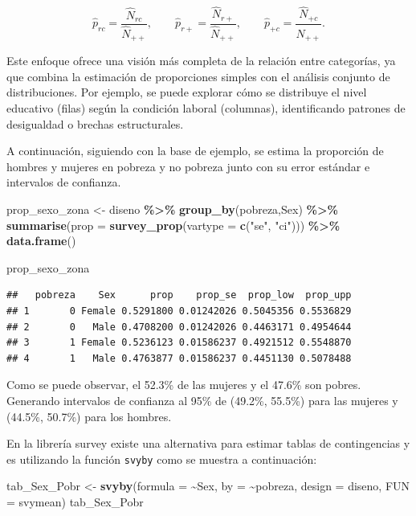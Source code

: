 \documentclass[
  spanish,
  12pt,
]{book}
\newenvironment{Shaded}{\begin{snugshade}}{\end{snugshade}}
\newcommand{\AttributeTok}[1]{\textcolor[rgb]{0.13,0.29,0.53}{#1}}
\newcommand{\FunctionTok}[1]{\textcolor[rgb]{0.13,0.29,0.53}{\textbf{#1}}}
\newcommand{\NormalTok}[1]{#1}
\newcommand{\OtherTok}[1]{\textcolor[rgb]{0.56,0.35,0.01}{#1}}
\newcommand{\SpecialCharTok}[1]{\textcolor[rgb]{0.81,0.36,0.00}{\textbf{#1}}}
\newcommand{\StringTok}[1]{\textcolor[rgb]{0.31,0.60,0.02}{#1}}
\begin{document}
\[
\hat{p}_{rc} = \frac{\hat{N}_{rc}}{\hat{N}_{++}}, \qquad 
\hat{p}_{r+} = \frac{\hat{N}_{r+}}{\hat{N}_{++}}, \qquad 
\hat{p}_{+c} = \frac{\hat{N}_{+c}}{\hat{N}_{++}}.
\]

Este enfoque ofrece una visión más completa de la relación entre categorías, ya que combina la estimación de proporciones simples con el análisis conjunto de distribuciones. Por ejemplo, se puede explorar cómo se distribuye el nivel educativo (filas) según la condición laboral (columnas), identificando patrones de desigualdad o brechas estructurales.

A continuación, siguiendo con la base de ejemplo, se estima la proporción de hombres y mujeres en pobreza y no pobreza junto con su error estándar e intervalos de confianza.

\begin{Shaded}
\begin{Highlighting}[]
\NormalTok{prop\_sexo\_zona }\OtherTok{\textless{}{-}}\NormalTok{ diseno }\SpecialCharTok{\%\textgreater{}\%} 
                  \FunctionTok{group\_by}\NormalTok{(pobreza,Sex) }\SpecialCharTok{\%\textgreater{}\%}
                  \FunctionTok{summarise}\NormalTok{(}\AttributeTok{prop =} \FunctionTok{survey\_prop}\NormalTok{(}\AttributeTok{vartype =} \FunctionTok{c}\NormalTok{(}\StringTok{"se"}\NormalTok{, }\StringTok{"ci"}\NormalTok{))) }\SpecialCharTok{\%\textgreater{}\%} 
                  \FunctionTok{data.frame}\NormalTok{()}

\NormalTok{prop\_sexo\_zona}
\end{Highlighting}
\end{Shaded}

\begin{verbatim}
##   pobreza    Sex      prop    prop_se  prop_low  prop_upp
## 1       0 Female 0.5291800 0.01242026 0.5045356 0.5536829
## 2       0   Male 0.4708200 0.01242026 0.4463171 0.4954644
## 3       1 Female 0.5236123 0.01586237 0.4921512 0.5548870
## 4       1   Male 0.4763877 0.01586237 0.4451130 0.5078488
\end{verbatim}

Como se puede observar, el 52.3\% de las mujeres y el 47.6\% son pobres. Generando intervalos de confianza al 95\% de (49.2\%, 55.5\%) para las mujeres y (44.5\%, 50.7\%) para los hombres.

En la librería survey existe una alternativa para estimar tablas de contingencias y es utilizando la función \texttt{svyby} como se muestra a continuación:

\begin{Shaded}
\begin{Highlighting}[]
\NormalTok{tab\_Sex\_Pobr }\OtherTok{\textless{}{-}} \FunctionTok{svyby}\NormalTok{(}\AttributeTok{formula =} \SpecialCharTok{\textasciitilde{}}\NormalTok{Sex, }\AttributeTok{by =}  \SpecialCharTok{\textasciitilde{}}\NormalTok{pobreza, }\AttributeTok{design =}\NormalTok{ diseno, }\AttributeTok{FUN =}\NormalTok{ svymean)}
\NormalTok{tab\_Sex\_Pobr}
\end{Highlighting}
\end{Shaded}
\end{document}
